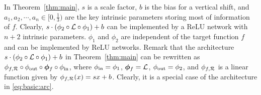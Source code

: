 \documentclass[nohyperref]{article}
\def\phiin{\phi_{\tn{in}}}
\def\phiout{\phi_{\tn{out}}}
\theoremstyle{plain}
\newtheorem{corollary}[theorem]{Corollary}
\theoremstyle{definition}
\theoremstyle{remark}
\begin{document}


In Theorem~\ref{thm:main}, $s$ is a scale factor, $b$ is the bias for a vertical shift, and $a_1,a_2,\cdots,a_n\in [0,\tfrac{1}{3})$ are the key intrinsic parameters storing most of information of $f$. Clearly, $s\cdot (\phi_2\circ {\mathcal{L}} \circ\phi_1)+b$ can be implemented by a ReLU network with $n+2$ intrinsic parameters.
$\phi_1$ and $\phi_2$ are independent of the target function $f$ and can be implemented by ReLU networks. Remark that 
the architecture $s\cdot(\phi_2\circ {\mathcal{L}} \circ\phi_1)+b$ in Theorem~\ref{thm:main} can be rewritten as $\phi_{f,\calR}\circ\phiout\circ\bmphi_f\circ\phiin$, where $\phiin=\phi_1$,
${\bm{\phi}}_f={\mathcal{L}}$, $\phiout=\phi_2$, and $\phi_{f,{\mathcal{R}}}$ is a linear function given by $\phi_{f,{\mathcal{R}}}(x)=sx+b$. 
Clearly, it is a special case of the architecture in \eqref{eq:basic:arc}.


\end{document}
